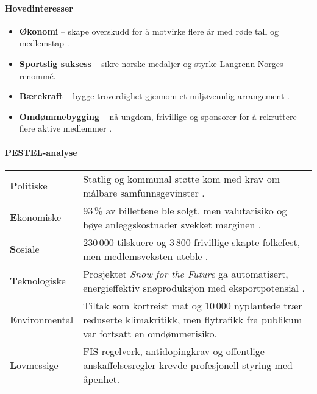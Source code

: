\paragraph{Hovedinteresser}
\begin{itemize}
    \item \textbf{Økonomi} -- skape overskudd for å motvirke flere år med røde tall og medlemstap \cite{Adresseavisen}.
    \item \textbf{Sportslig suksess} -- sikre norske medaljer og styrke Langrenn Norges renommé.
    \item \textbf{Bærekraft} -- bygge troverdighet gjennom et miljøvennlig arrangement \cite{TrondheimKommuneVM}.
    \item \textbf{Omdømmebygging} -- nå ungdom, frivillige og sponsorer for å rekruttere flere aktive medlemmer \cite{OsloVM}.
\end{itemize}

\paragraph{PESTEL-analyse}
\begin{table}[ht]
    \centering
    \begin{tabular}{@{}p{2.7cm}p{10.2cm}@{}}
        \toprule \\ \midrule
        \textbf{P}olitiske     & Statlig og kommunal støtte kom med krav om målbare samfunnsgevinster \cite{TrondheimKommuneVM}. \\
        \textbf{E}konomiske    & 93\,\% av billettene ble solgt, men valutarisiko og høye anleggskostnader svekket marginen \cite{AdressaKjopefest}. \\
        \textbf{S}osiale       & 230\,000 tilskuere og 3\,800 frivillige skapte folkefest, men medlemsveksten uteble \cite{Adresseavisen,OsloVM}. \\
        \textbf{T}eknologiske  & Prosjektet \textit{Snow for the Future} ga automatisert, energieffektiv snøproduksjon med eksportpotensial \cite{Trondheim2025Sustainability}. \\
        \textbf{E}nvironmental & Tiltak som kortreist mat og 10\,000 nyplantede trær reduserte klimakritikk, men flytrafikk fra publikum var fortsatt en omdømmerisiko. \\
        \textbf{L}ovmessige    & FIS-regelverk, antidopingkrav og offentlige anskaffelsesregler krevde profesjonell styring med åpenhet. \\ \bottomrule
    \end{tabular}
\end{table}

